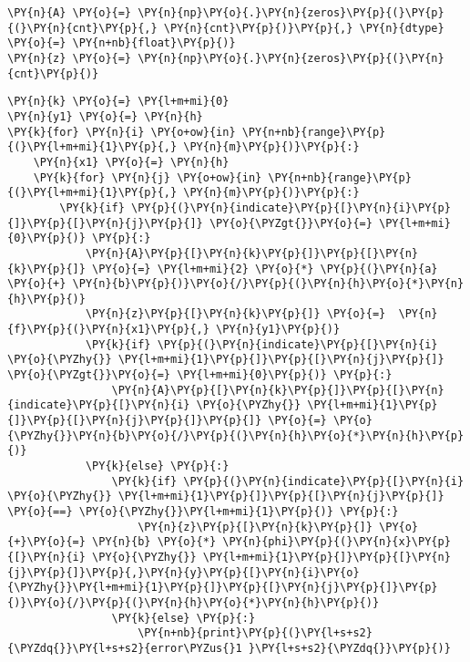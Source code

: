     \begin{tcolorbox}[breakable, size=fbox, boxrule=1pt, pad at break*=1mm,colback=cellbackground, colframe=cellborder]
\begin{Verbatim}[commandchars=\\\{\}]
\PY{n}{A} \PY{o}{=} \PY{n}{np}\PY{o}{.}\PY{n}{zeros}\PY{p}{(}\PY{p}{(}\PY{n}{cnt}\PY{p}{,} \PY{n}{cnt}\PY{p}{)}\PY{p}{,} \PY{n}{dtype} \PY{o}{=} \PY{n+nb}{float}\PY{p}{)}
\PY{n}{z} \PY{o}{=} \PY{n}{np}\PY{o}{.}\PY{n}{zeros}\PY{p}{(}\PY{n}{cnt}\PY{p}{)}
\end{Verbatim}
\end{tcolorbox}

    \begin{tcolorbox}[breakable, size=fbox, boxrule=1pt, pad at break*=1mm,colback=cellbackground, colframe=cellborder]
\begin{Verbatim}[commandchars=\\\{\}]
\PY{n}{k} \PY{o}{=} \PY{l+m+mi}{0}
\PY{n}{y1} \PY{o}{=} \PY{n}{h}
\PY{k}{for} \PY{n}{i} \PY{o+ow}{in} \PY{n+nb}{range}\PY{p}{(}\PY{l+m+mi}{1}\PY{p}{,} \PY{n}{m}\PY{p}{)}\PY{p}{:}
    \PY{n}{x1} \PY{o}{=} \PY{n}{h}
    \PY{k}{for} \PY{n}{j} \PY{o+ow}{in} \PY{n+nb}{range}\PY{p}{(}\PY{l+m+mi}{1}\PY{p}{,} \PY{n}{m}\PY{p}{)}\PY{p}{:}
        \PY{k}{if} \PY{p}{(}\PY{n}{indicate}\PY{p}{[}\PY{n}{i}\PY{p}{]}\PY{p}{[}\PY{n}{j}\PY{p}{]} \PY{o}{\PYZgt{}}\PY{o}{=} \PY{l+m+mi}{0}\PY{p}{)} \PY{p}{:}
            \PY{n}{A}\PY{p}{[}\PY{n}{k}\PY{p}{]}\PY{p}{[}\PY{n}{k}\PY{p}{]} \PY{o}{=} \PY{l+m+mi}{2} \PY{o}{*} \PY{p}{(}\PY{n}{a} \PY{o}{+} \PY{n}{b}\PY{p}{)}\PY{o}{/}\PY{p}{(}\PY{n}{h}\PY{o}{*}\PY{n}{h}\PY{p}{)}
            \PY{n}{z}\PY{p}{[}\PY{n}{k}\PY{p}{]} \PY{o}{=}  \PY{n}{f}\PY{p}{(}\PY{n}{x1}\PY{p}{,} \PY{n}{y1}\PY{p}{)}
            \PY{k}{if} \PY{p}{(}\PY{n}{indicate}\PY{p}{[}\PY{n}{i} \PY{o}{\PYZhy{}} \PY{l+m+mi}{1}\PY{p}{]}\PY{p}{[}\PY{n}{j}\PY{p}{]} \PY{o}{\PYZgt{}}\PY{o}{=} \PY{l+m+mi}{0}\PY{p}{)} \PY{p}{:}
                \PY{n}{A}\PY{p}{[}\PY{n}{k}\PY{p}{]}\PY{p}{[}\PY{n}{indicate}\PY{p}{[}\PY{n}{i} \PY{o}{\PYZhy{}} \PY{l+m+mi}{1}\PY{p}{]}\PY{p}{[}\PY{n}{j}\PY{p}{]}\PY{p}{]} \PY{o}{=} \PY{o}{\PYZhy{}}\PY{n}{b}\PY{o}{/}\PY{p}{(}\PY{n}{h}\PY{o}{*}\PY{n}{h}\PY{p}{)}
            \PY{k}{else} \PY{p}{:}
                \PY{k}{if} \PY{p}{(}\PY{n}{indicate}\PY{p}{[}\PY{n}{i} \PY{o}{\PYZhy{}} \PY{l+m+mi}{1}\PY{p}{]}\PY{p}{[}\PY{n}{j}\PY{p}{]} \PY{o}{==} \PY{o}{\PYZhy{}}\PY{l+m+mi}{1}\PY{p}{)} \PY{p}{:}
                    \PY{n}{z}\PY{p}{[}\PY{n}{k}\PY{p}{]} \PY{o}{+}\PY{o}{=} \PY{n}{b} \PY{o}{*} \PY{n}{phi}\PY{p}{(}\PY{n}{x}\PY{p}{[}\PY{n}{i} \PY{o}{\PYZhy{}} \PY{l+m+mi}{1}\PY{p}{]}\PY{p}{[}\PY{n}{j}\PY{p}{]}\PY{p}{,}\PY{n}{y}\PY{p}{[}\PY{n}{i}\PY{o}{\PYZhy{}}\PY{l+m+mi}{1}\PY{p}{]}\PY{p}{[}\PY{n}{j}\PY{p}{]}\PY{p}{)}\PY{o}{/}\PY{p}{(}\PY{n}{h}\PY{o}{*}\PY{n}{h}\PY{p}{)}
                \PY{k}{else} \PY{p}{:}
                    \PY{n+nb}{print}\PY{p}{(}\PY{l+s+s2}{\PYZdq{}}\PY{l+s+s2}{error\PYZus{}1 }\PY{l+s+s2}{\PYZdq{}}\PY{p}{)}
                    

\end{Verbatim}
\end{tcolorbox}
